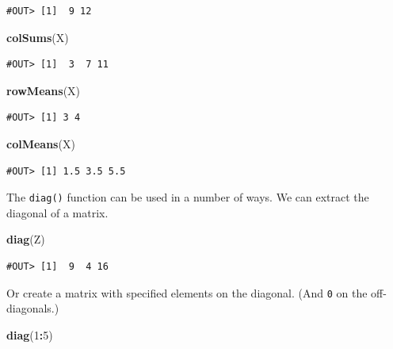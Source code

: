 \documentclass[]{book}
\newenvironment{Shaded}{\begin{snugshade}}{\end{snugshade}}
\newcommand{\KeywordTok}[1]{\textcolor[rgb]{0.13,0.29,0.53}{\textbf{#1}}}
\newcommand{\DecValTok}[1]{\textcolor[rgb]{0.00,0.00,0.81}{#1}}
\newcommand{\OperatorTok}[1]{\textcolor[rgb]{0.81,0.36,0.00}{\textbf{#1}}}
\newcommand{\NormalTok}[1]{#1}
\theoremstyle{definition}
\theoremstyle{definition}
\theoremstyle{definition}
\theoremstyle{remark}
\begin{document}
\begin{verbatim}
#OUT> [1]  9 12
\end{verbatim}

\begin{Shaded}
\begin{Highlighting}[]
\KeywordTok{colSums}\NormalTok{(X)}
\end{Highlighting}
\end{Shaded}

\begin{verbatim}
#OUT> [1]  3  7 11
\end{verbatim}

\begin{Shaded}
\begin{Highlighting}[]
\KeywordTok{rowMeans}\NormalTok{(X)}
\end{Highlighting}
\end{Shaded}

\begin{verbatim}
#OUT> [1] 3 4
\end{verbatim}

\begin{Shaded}
\begin{Highlighting}[]
\KeywordTok{colMeans}\NormalTok{(X)}
\end{Highlighting}
\end{Shaded}

\begin{verbatim}
#OUT> [1] 1.5 3.5 5.5
\end{verbatim}

The \texttt{diag()} function can be used in a number of ways. We can
extract the diagonal of a matrix.

\begin{Shaded}
\begin{Highlighting}[]
\KeywordTok{diag}\NormalTok{(Z)}
\end{Highlighting}
\end{Shaded}

\begin{verbatim}
#OUT> [1]  9  4 16
\end{verbatim}

Or create a matrix with specified elements on the diagonal. (And
\texttt{0} on the off-diagonals.)

\begin{Shaded}
\begin{Highlighting}[]
\KeywordTok{diag}\NormalTok{(}\DecValTok{1}\OperatorTok{:}\DecValTok{5}\NormalTok{)}
\end{Highlighting}
\end{Shaded}
\end{document}
